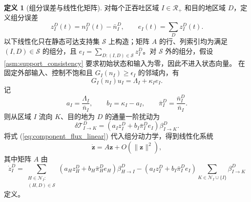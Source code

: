 \documentclass[a4paper,12pt]{article}
\theoremstyle{plain}
\theoremstyle{definition}
\newtheorem{definition}[theorem]{定义}
\theoremstyle{remark}
\begin{document}
\begin{definition}[组分误差与线性化矩阵]\label{def:component_jacobian}
对每个正吞吐区域 $I\in\mathcal R_+$ 和目的地区域 $D$，定义组分误差
\begin{equation}
    z_I^D(t)=n_I^D(t)-\bar n_I^D,\qquad e_I(t)=\sum_D z_I^D(t).
\end{equation}
以下线性化只在静态可达支持集 $\mathcal S$ 上构造；矩阵 $A$ 的行、列索引均为满足 $(I,D)\in\mathcal S$ 的组分，且 $e_I=\sum_{D:(I,D)\in\mathcal S}z_I^D$。对 $\mathcal S$ 外的组分，假设 \ref{asm:support_consistency} 要求初始状态和输入为零，因此不进入状态向量。
在固定外部输入、控制不饱和且 $G_I(n_I)\ge\epsilon_I$ 的邻域内，有
\begin{equation}
    G_I(n_I)u_I=\Lambda_I+\kappa_I e_I .
\end{equation}
记
\begin{equation}
    a_I=\frac{\Lambda_I}{\bar n_I},\qquad b_I=\kappa_I-a_I,\qquad
    \bar\pi_I^D=\frac{\bar n_I^D}{\bar n_I}.
\end{equation}
则从区域 $I$ 流向 $K$、目的地为 $D$ 的通量一阶扰动为
\begin{equation}\label{eq:component_flux_linear}
    \delta \mathcal T_{I\to K}^D
    =
    \left(a_I z_I^D+b_I\bar\pi_I^D e_I\right)\beta_{I\to K}^D .
\end{equation}
将式 (\ref{eq:component_flux_linear}) 代入组分动力学，得到线性化系统
\begin{equation}\label{eq:component_linear_system}
    \dot{\bm z}=A\bm z+O(\|\bm z\|^2),
\end{equation}
其中矩阵 $A$ 由
\begin{equation}\label{eq:component_jacobian}
    \dot z_I^D
    =
    \sum_{\substack{H\in\mathcal N_I:\\(H,D)\in\mathcal S}}
    \left(a_H z_H^D+b_H\bar\pi_H^D e_H\right)\beta_{H\to I}^D
    -
    \left(a_I z_I^D+b_I\bar\pi_I^D e_I\right)
    \sum_{K\in\mathcal N_I\cup\{I\}}\beta_{I\to K}^D
\end{equation}
定义。
\end{definition}
\end{document}
